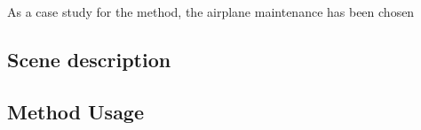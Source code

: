 As a case study for the method, the airplane maintenance has been chosen

\subsection{Scene description}

\subsection{Method Usage}

